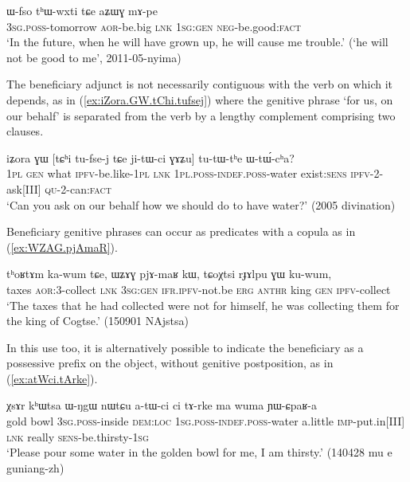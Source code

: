 \begin{exe}
\ex \label{ex:aZWG.mApe}
\gll  ɯ-fso tʰɯ-wxti tɕe aʑɯɣ mɤ-pe \\ 
\textsc{3sg}.\textsc{poss}-tomorrow \textsc{aor}-be.big \textsc{lnk} \textsc{1sg}:\textsc{gen} \textsc{neg}-be.good:\textsc{fact} \\
\glt `In the future, when he will have grown up, he will cause me trouble.' (`he will not be good to me', 2011-05-nyima)
\end{exe}

The beneficiary adjunct is not necessarily contiguous with the verb on which it depends, as in (\ref{ex:iZora.GW.tChi.tufsej}) where the genitive phrase  `for us, on our behalf'  is separated from the verb  by a lengthy complement comprising two clauses.

\begin{exe}
\ex \label{ex:iZora.GW.tChi.tufsej}
\gll  iʑora ɣɯ [tɕʰi tu-fse-j tɕe ji-tɯ-ci ɣɤʑu] tu-tɯ-tʰe ɯ-tɯ́-cʰa? \\
\textsc{1pl} \textsc{gen} what \textsc{ipfv}-be.like-\textsc{1pl} \textsc{lnk} \textsc{1pl}.\textsc{poss}-\textsc{indef}.\textsc{poss}-water exist:\textsc{sens} \textsc{ipfv}-2-ask[III] \textsc{qu}-2-can:\textsc{fact} \\
\glt `Can you ask on our behalf how we should do to have water?' (2005 divination)
\end{exe}

Beneficiary genitive phrases can occur as predicates with a copula as  in (\ref{ex:WZAG.pjAmaR}).

 \begin{exe}
\ex \label{ex:WZAG.pjAmaR}
\gll   tʰoʁtɤm ka-wum tɕe, ɯʑɤɣ pjɤ-maʁ kɯ, tɕoχtsi rɟɤlpu ɣɯ ku-wum,  \\
taxes \textsc{aor}:3\flobv{}-collect \textsc{lnk} \textsc{3sg}:\textsc{gen} \textsc{ifr}.\textsc{ipfv}-not.be \textsc{erg}  \textsc{anthr} king \textsc{gen} \textsc{ipfv}-collect \\
\glt `The taxes that he had collected were not for himself, he was collecting them for the king of Cogtse.' (150901 NAjstsa)
\end{exe}

In this use too, it is alternatively possible to indicate the beneficiary as a possessive prefix on the object, without genitive postposition, as in (\ref{ex:atWci.tArke}).

 \begin{exe}
\ex \label{ex:atWci.tArke}
\gll   χsɤr kʰɯtsa ɯ-ŋgɯ nɯtɕu a-tɯ-ci ci tɤ-rke ma wuma ɲɯ-ɕpaʁ-a \\
gold bowl \textsc{3sg}.\textsc{poss}-inside \textsc{dem}:\textsc{loc} \textsc{1sg}.\textsc{poss}-\textsc{indef}.\textsc{poss}-water a.little \textsc{imp}-put.in[III] \textsc{lnk} really \textsc{sens}-be.thirsty-\textsc{1sg} \\
\glt  `Please pour some water in the golden bowl for me, I am thirsty.' (140428 mu e guniang-zh)
\end{exe}

